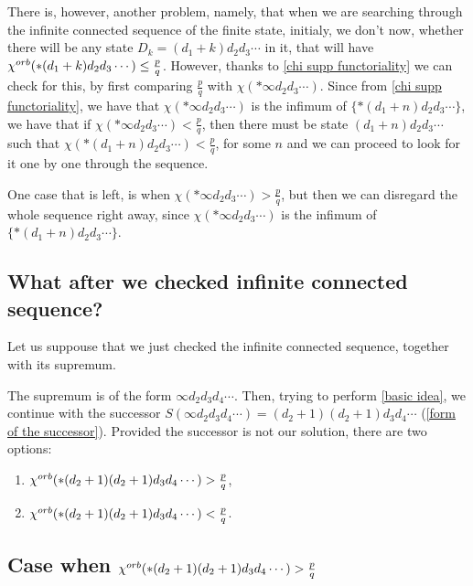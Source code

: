 There is, however, another problem, namely, that when we are searching through 
the infinite connected sequence of the finite state, 
initialy, we don't now, whether there will be any state 
$D_k = (d_1+k)d_2d_3\cdots$ in it, that 
will have ${\chi^{orb}(*(d_1+k)d_2d_3\cdots)} \leq \frac{p}{q}$. 
However, thanks to \ref{chi supp functoriality} 
we can check for this, by first comparing $\frac{p}{q}$ with $\chi(*\infty d_2d_3\cdots)$. 
Since from \ref{chi supp functoriality}, we have that 
$\chi(*\infty d_2d_3\cdots)$ is the infimum of $\{*(d_1+n)d_2d_3\cdots\}$, 
we have that if $\chi(*\infty d_2d_3\cdots) < \frac{p}{q}$, then
there must be state $(d_1+n)d_2d_3\cdots$ such that $\chi(*(d_1+n)d_2d_3\cdots) < \frac{p}{q}$, 
for some $n$ and we can proceed to look for it one by one through the sequence.

One case that is left, is when $\chi(*\infty d_2d_3\cdots) > \frac{p}{q}$, but then we can 
disregard the whole sequence right away, since 
$\chi(*\infty d_2d_3\cdots)$ is the infimum of $\{*(d_1+n)d_2d_3\cdots\}$.

\subsection{What after we checked infinite connected sequence?}
Let us suppouse that we just checked the infinite connected sequence, together with its supremum. 


The supremum is of the form $\infty d_2 d_3d_4\cdots$.
Then, trying to perform \ref{basic idea}, 
we continue with the successor $S(\infty d_2 d_3d_4\cdots) = (d_2+1)(d_2+1)d_3d_4\cdots$ 
(\ref{form of the successor}). Provided the successor is not our solution, 
there are two options:
\begin{enumerate} 
\item ${\chi^{orb}(*(d_2+1)(d_2+1)d_3d_4\cdots)} > \frac{p}{q}$,
\item ${\chi^{orb}(*(d_2+1)(d_2+1)d_3d_4\cdots)} < \frac{p}{q}$.
\end{enumerate} 

\subsection{Case when ${\chi^{orb}(*(d_2+1)(d_2+1)d_3d_4\cdots)} > \frac{p}{q}$}\label{greater idea}

